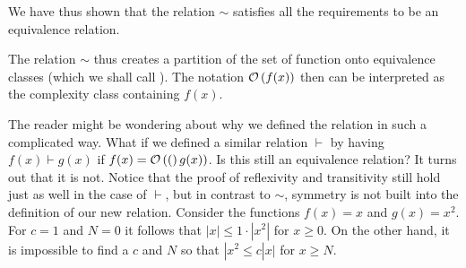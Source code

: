 We have thus shown that the relation $\sim$ satisfies all the requirements to
be an equivalence relation.

The relation $\sim$ thus creates a partition of the set of function onto
equivalence classes (which we shall call ). The
notation
${\mathcal O}\/\left(f(x)\right)$ then can be interpreted as the complexity class containing $f(x)$.
\medskip

The reader might be wondering about why we defined the relation in such a
complicated way. What if we
defined a similar relation $\vdash$ by having $f(x) \vdash g(x)$
if $f(x) = {\mathcal O}\/\left((\right)g(x))$. Is this still an equivalence relation?
It turns out that it is not. Notice that the proof of reflexivity
and transitivity still hold just as well in the case of $\vdash$, but
in contrast to $\sim$, symmetry is not built into the definition of our new
relation. Consider the functions $f(x) = x$ and $g(x)=x^2$. For $c=1$ and
$N=0$ it follows that $|x|\leq 1\cdot |x^2|$ for $x\geq0$. On the other
hand, it is impossible to find a $c$ and $N$ so that $|x^2\leq c|x|$ for
$x \geq N$.




%




